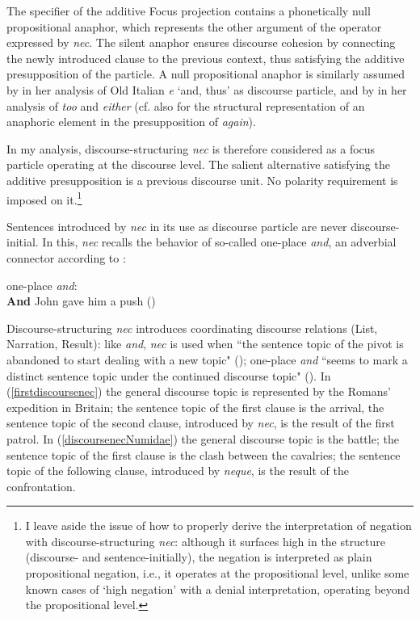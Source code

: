 \documentclass[output=paper,modfonts,nonflat,citecolor=brown,
showindex
]{langsci/langscibook}
\begin{document}
The specifier of the additive Focus projection contains a phonetically null \linebreak propositional anaphor, which represents the other argument of the operator expressed by {\emph{nec}}. The silent anaphor ensures discourse cohesion by connecting the newly introduced clause to the previous context, thus satisfying the additive presupposition of the particle. A null propositional anaphor is similarly assumed by \citet[22--27]{Poletto14} in her analysis of Old Italian {\emph{e}} `and, thus' as discourse particle, and by \citet{Ahn15} in her analysis of {\emph{too}} and {\emph{either}} (cf. also \citealt[]{Beck06} for the structural representation of an anaphoric element in the presupposition of {\emph{again}}).

In my analysis, discourse-structuring {\emph{nec}} is therefore considered as a focus particle operating at the discourse level. The salient alternative satisfying the additive presupposition is a previous discourse unit. No polarity requirement is imposed on it.{\footnote{I leave aside the issue of how to properly derive the interpretation of negation with discourse-structuring {\emph{nec}}: although it surfaces high in the structure (discourse- and sentence-initially), the negation is interpreted as plain propositional negation, i.e., it operates at the propositional level, unlike some known cases of `high negation' with a denial interpretation, operating beyond the propositional level.}}

Sentences introduced by {\emph{nec}} in its use as discourse particle are never discourse-initial. In this, {\emph{nec}} recalls the behavior of so-called one-place {\emph{and}}, an adverbial connector according to \citet[]{ZeevatJasinskaja07}:

{\begin{exe}
\ex one-place {\emph{and}}:\\
{\textbf{And}} John gave him a push (\citealt[their ex. 7]{ZeevatJasinskaja07})
\end{exe}}

 \noindent Discourse-structuring {\emph{nec}} introduces coordinating discourse relations (List, Narration, Result): like {\emph{and}}, {\emph{nec}} is used when ``the sentence topic of the pivot is abandoned to start dealing with a new topic" (\citealt[325]{ZeevatJasinskaja07}); one-place {\emph{and}} ``seems to mark a distinct sentence topic under the continued discourse topic" (\citealt[325]{ZeevatJasinskaja07}). In (\ref{firstdiscoursenec}) the general discourse topic is represented by the Romans' expedition in Britain; the sentence topic of the first clause is the arrival, the sentence topic of the second clause, introduced by {\emph{nec}}, is the result of the first patrol. In (\ref{discoursenecNumidae}) the general discourse topic is the battle; the sentence topic of the first clause is the clash between the cavalries; the sentence topic of the following clause, introduced by {\emph{neque}}, is the result of the confrontation.
\end{document}
